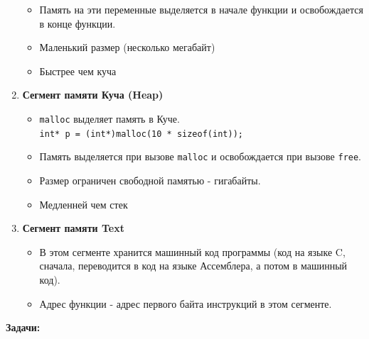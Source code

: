 \documentclass{article}
\begin{document}
\begin{multicols}{2}
\begin{enumerate}
\begin{itemize}
\item Память на эти переменные выделяется в начале функции и освобождается в конце функции.
\item Маленький размер (несколько мегабайт)
\item Быстрее чем куча
\end{itemize}
\item \textbf{Сегмент памяти Куча (Heap)} \\
\begin{itemize}
\item \texttt{malloc} выделяет память в Куче.\\ \texttt{int* p = (int*)malloc(10 * sizeof(int));}
\item Память выделяется при вызове \texttt{malloc} и освобождается при вызове \texttt{free}.
\item Размер ограничен свободной памятью - гигабайты.
\item Медленней чем стек
\end{itemize}
\item \textbf{Сегмент памяти Text} \\
\begin{itemize}
\item В этом сегменте хранится машинный код программы (код на языке C, сначала, переводится в код на языке Ассемблера, а потом в машинный код).
\item Адрес функции - адрес первого байта инструкций в этом сегменте.
\end{itemize}
\end{enumerate}
\end{multicols}
\textbf{Задачи:}
\end{document}
